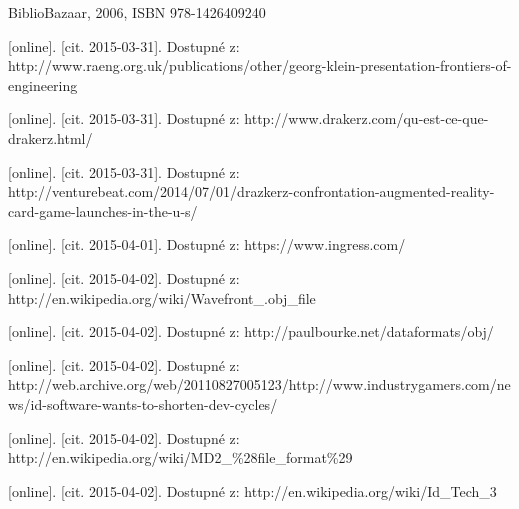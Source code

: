 \documentclass[twoside,12pt]{article}
\begin{document}
% 
% 
\begin{literatura}


 {
	BiblioBazaar, 2006, ISBN 978-1426409240
}

{
	 [online]. [cit. 2015-03-31]. Dostupné z: 		http://www.raeng.org.uk/publications/other/georg-klein-presentation-frontiers-of-engineering
}

{
	 [online]. [cit. 2015-03-31]. Dostupné z: http://www.drakerz.com/qu-est-ce-que-drakerz.html/
}

{
	 [online]. [cit. 2015-03-31]. Dostupné z: http://venturebeat.com/2014/07/01/drazkerz-confrontation-augmented-reality-card-game-launches-in-the-u-s/
}

{
	 [online]. [cit. 2015-04-01]. Dostupné z: https://www.ingress.com/
}

{
	 [online]. [cit. 2015-04-02]. Dostupné z: http://en.wikipedia.org/wiki/Wavefront\_.obj\_file
}

{
	 [online]. [cit. 2015-04-02]. Dostupné z: http://paulbourke.net/dataformats/obj/
}

{
	 [online]. [cit. 2015-04-02]. Dostupné z: http://web.archive.org/web/20110827005123/http://www.industrygamers.com/news/id-software-wants-to-shorten-dev-cycles/
}

{
	 [online]. [cit. 2015-04-02]. Dostupné z: http://en.wikipedia.org/wiki/MD2\_\%28file\_format\%29
}

{
	 [online]. [cit. 2015-04-02]. Dostupné z: http://en.wikipedia.org/wiki/Id\_Tech\_3
}


\end{literatura}
\end{document}
